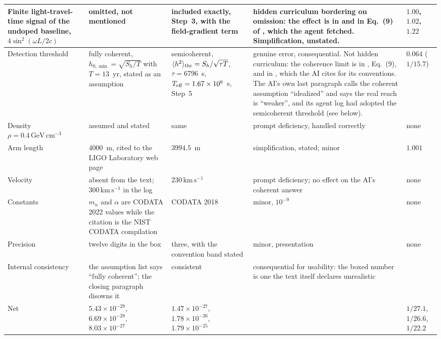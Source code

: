 \begin{longtable}{p{3.0cm}p{3.2cm}p{3.4cm}p{4.2cm}p{1.8cm}}
\midrule
Finite light-travel-time signal of the undoped baseline, $4\sin^2(\omega L/2c)$ & omitted, not mentioned & included exactly, Step~3, with the field-gradient term & hidden curriculum bordering on omission: the effect is in \citet{Morisaki2021} and in Eq.~(9) of \citet{Michimura2020}, which the agent fetched. Simplification, unstated. & $1.00$, $1.02$, $1.22$ \\
\midrule
Detection threshold & fully coherent, $h_{0,\min}=\sqrt{S_h/T}$ with $T=13$~yr, stated as an assumption & semicoherent, $\langle h^2\rangle_{\rm thr}=S_h/\sqrt{\tau T}$, $\tau=6796$~s, $T_{\rm eff}=1.67\times10^6$~s, Step~5 & genuine error, consequential. Not hidden curriculum: the coherence limit is in \citet{Pierce2018}, Eq.~(9), and in \citet{Guo2019}, which the AI cites for its conventions. The AI's own last paragraph calls the coherent assumption ``idealized'' and says the real reach is ``weaker'', and its agent log had adopted the semicoherent threshold (see below). & $0.064$ ($1/15.7$) \\
\midrule
Density $\rho=0.4\,\mathrm{GeV\,cm^{-3}}$ & assumed and stated & same & prompt deficiency, handled correctly & none \\
\midrule
Arm length & $4000$~m, cited to the LIGO Laboratory web page & $3994.5$~m \citep{Aasi2015} & simplification, stated; minor & $1.001$ \\
\midrule
Velocity & absent from the text; $300\,\mathrm{km\,s^{-1}}$ in the log & $230\,\mathrm{km\,s^{-1}}$ & prompt deficiency; no effect on the AI's coherent answer & none \\
\midrule
Constants & $m_n$ and $\alpha$ are CODATA 2022 values while the citation is the NIST CODATA compilation & CODATA 2018 & minor, $10^{-9}$ & none \\
\midrule
Precision & twelve digits in the box & three, with the convention band stated & minor, presentation & none \\
\midrule
Internal consistency & the assumption list says ``fully coherent''; the closing paragraph disowns it & consistent & consequential for usability: the boxed number is one the text itself declares unrealistic & \\
\midrule
Net & $5.43\times10^{-29}$, $6.69\times10^{-28}$, $8.03\times10^{-27}$ & $1.47\times10^{-27}$, $1.78\times10^{-26}$, $1.79\times10^{-25}$ & & $1/27.1$, $1/26.6$, $1/22.2$ \\
\end{longtable}
\endgroup

